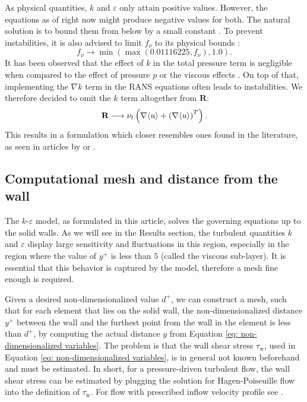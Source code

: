 As physical quantities, \(k\) and \(\varepsilon\) only attain positive values. However, the equations as of right now might produce negative values for both. The natural solution is to bound them from below by a small constant \citep{lew_note_2001}. To prevent instabilities, it is also advised to limit \(f_\nu\) to its physical bounds \citep{schimdt_two-equation_1988}:
\begin{equation*}\label{eq: Physical bound of fnu}
    f_\nu \longrightarrow \min(\max(0.01116225, f_\nu), 1.0).
\end{equation*}
It has been observed that the effect of \(k\) in the total pressure term is negligible when compared to the effect of pressure \(p\) or the viscous effects \citep{Ansys_Best_Practice}. On top of that, implementing the \(\nabla k\) term in the RANS equations often leads to instabilities. We therefore decided to omit the \(k\) term altogether from \(\mathbf{R}\):
\begin{equation*}\label{eq: Removing k from R}
    \mathbf{R} \longrightarrow \nu_t \left( \Grad \langle u \rangle + \left( \Grad \langle u \rangle \right)^T \right).
\end{equation*}
This results in a formulation which closer resembles ones found in the literature, as seen in articles by \cite{valen_implementing_2013} or \cite{greenshields_notes_2022}.

\subsection{Computational mesh and distance from the wall}

The \(k\)-\(\varepsilon\) model, as formulated in this article, solves the governing equations up to the solid walls. As we will see in the Results section, the turbulent quantities \(k\) and \(\varepsilon\) display large sensitivity and fluctuations in this region, especially in the region where the value of \(y^+\) is less than \(5\) (called the viscous sub-layer). It is essential that this behavior is captured by the model, therefore a mesh fine enough is required. 

Given a desired non-dimensionalized value \(d^+\), we can construct a mesh, such that for each element that lies on the solid wall, the non-dimensionalized distance \(y^+\) between the wall and the furthest point from the wall in the element is less than \(d^+\), by computing the actual distance \(y\) from Equation \eqref{eq: non-dimensionalized variables}. The problem is that the wall shear stress \(\tau_\text{w}\), used in Equation \eqref{eq: non-dimensionalized variables}, is in general not known beforehand and must be estimated. In short, for a pressure-driven turbulent flow, the wall shear stress can be estimated by plugging the solution for Hagen-Poiseuille flow into the definition of \(\tau_\text{w}\). For flow with prescribed inflow velocity profile see \citep{noauthor_cfd_nodate}.

